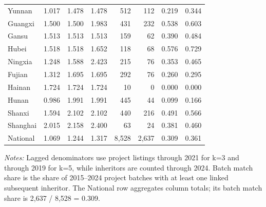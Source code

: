 \begin{table}[!htbp]
{\begin{tabular}{lrrrrrrr}
Yunnan & 1.017 & 1.478 & 1.478 & 512 & 112 & 0.219 & 0.344 \\
Guangxi & 1.500 & 1.500 & 1.983 & 431 & 232 & 0.538 & 0.603 \\
Gansu & 1.513 & 1.513 & 1.513 & 159 & 62 & 0.390 & 0.484 \\
Hubei & 1.518 & 1.518 & 1.652 & 118 & 68 & 0.576 & 0.729 \\
Ningxia & 1.248 & 1.588 & 2.423 & 215 & 76 & 0.353 & 0.465 \\
Fujian & 1.312 & 1.695 & 1.695 & 292 & 76 & 0.260 & 0.295 \\
Hainan & 1.724 & 1.724 & 1.724 & 10 & 0 & 0.000 & 0.000 \\
Hunan & 0.986 & 1.991 & 1.991 & 445 & 44 & 0.099 & 0.166 \\
Shanxi & 1.594 & 2.102 & 2.102 & 440 & 216 & 0.491 & 0.566 \\
Shanghai & 2.015 & 2.158 & 2.400 & 63 & 24 & 0.381 & 0.460 \\
National & 1.069 & 1.244 & 1.317 & 8,528 & 2,637 & 0.309 & 0.361 \\
\bottomrule
\end{tabular}
}
\begin{minipage}{0.96\textwidth}
\footnotesize \textit{Notes:} Lagged denominators use project listings through 2021 for k=3 and through 2019 for k=5, while inheritors are counted through 2024. Batch match share is the share of 2015--2024 project batches with at least one linked subsequent inheritor. The National row aggregates column totals; its batch match share is 2,637 / 8,528 = 0.309.
\end{minipage}
\end{table}
